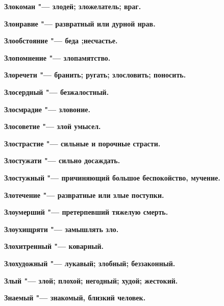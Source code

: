 \begin{multicols}{2}
\bfseries Злокоман\normalfont{} "--- злодей; зложелатель; враг. 




\bfseries Злонравие\normalfont{} "--- развратный или дурной нрав. 




\bfseries Злообстояние\normalfont{} "--- беда ;несчастье. 




\bfseries Злопомнение\normalfont{} "--- злопамятство. 




\bfseries Злоречети\normalfont{} "--- бранить; ругать; злословить; поносить. 




\bfseries Злосердный\normalfont{} "--- безжалостный. 




\bfseries Злосмрадие\normalfont{} "--- зловоние. 




\bfseries Злосоветие\normalfont{} "--- злой умысел. 




\bfseries Злострастие\normalfont{} "--- сильные и порочные страсти. 




\bfseries Злостужати\normalfont{} "--- сильно досаждать. 




\bfseries Злостужный\normalfont{} "--- причиняющий большое беспокойство, мучение. 




\bfseries Злотечение\normalfont{} "--- развратные или злые поступки. 




\bfseries Злоумерший\normalfont{} "--- претерпевший тяжелую смерть. 




\bfseries Злоухищряти\normalfont{} "--- замышлять зло. 




\bfseries Злохитренный\normalfont{} "--- коварный. 




\bfseries Злохудожный\normalfont{} "--- лукавый; злобный; беззаконный. 




\bfseries Злый\normalfont{} "--- злой; плохой; негодный; худой; жестокий. 




\bfseries Знаемый\normalfont{} "--- знакомый, близкий человек. 





\end{multicols}
